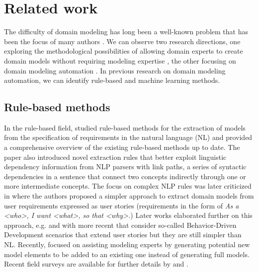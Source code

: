 \chapter{Related work}
\label{chap:related_work}

The difficulty of domain modeling has long been a well-known problem that has been the focus of many authors \cite{Bossung2007}.
We can observe two research directions, one exploring the methodological possibilities of allowing domain experts to create domain models without requiring modeling expertise \cite{Bossung2007,Denaux2011,Ionita2015}, the other focusing on domain modeling automation \cite{Arora2016,Saeedizade2024,Lucassen2017,Burgueno2021}. In previous research on domain modeling automation, we can identify rule-based and machine learning methods.


\section{Rule-based methods}

In the rule-based field, \citet{Arora2016} studied rule-based methods for the extraction of models from the specification of requirements in the natural language (NL) and provided a comprehensive overview of the existing rule-based methods up to date.
The paper also introduced novel extraction rules that better exploit linguistic dependency information from NLP parsers with link paths, a series of syntactic dependencies in a sentence that connect two concepts indirectly through one or more intermediate concepts.
The focus on complex NLP rules was later criticized in \cite{Lucassen2017} where the authors proposed a simpler approach to extract domain models from user requirements expressed as user stories (requirements in the form of \emph{As a <who>, I want <what>, so that <why>.})
Later works elaborated further on this approach, e.g. \citet{Nasiri2021} and with more recent \citet{Gupta2023} that consider so-called Behavior-Driven Development scenarios that extend user stories but they are still simpler than NL.
Recently, \citet{Burgueno2021} focused on assisting modeling experts by generating potential new model elements to be added to an existing one instead of generating full models.
Recent field surveys are available for further details by \citet{Raharjana2021} and \citet{Sonbol2022}.


